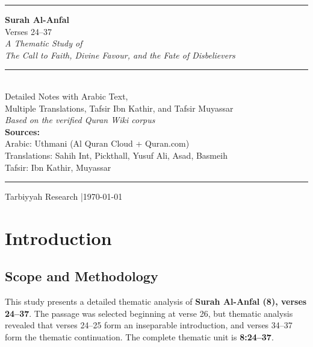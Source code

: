 \documentclass[11pt,a4paper,openany]{book}
\begin{document}
\begin{titlepage}
\thispagestyle{empty}
\begin{center}
\vspace*{3cm}
{\color{accent}\rule{\textwidth}{2pt}}
\vspace{1.5cm}
{\Huge\bfseries\color{primary} Surah Al-Anfal}\\[0.5cm]
{\LARGE\color{primarydk} Verses 24--37}\\[1cm]
{\Large\color{accent2}\itshape A Thematic Study of\\[0.3cm] The Call to Faith, Divine Favour, and the Fate of Disbelievers}\\[1.5cm]
{\color{accent}\rule{0.6\textwidth}{1pt}}\\[0.8cm]
{\large\color{textmuted} Detailed Notes with Arabic Text,\\ Multiple Translations, Tafsir Ibn Kathir, and Tafsir Muyassar}\\[0.5cm]
{\normalsize\color{textmuted}\itshape Based on the verified Quran Wiki corpus}\\[2cm]
{\small\color{textmuted}\textbf{Sources:}\\ Arabic: Uthmani (Al Quran Cloud + Quran.com)\\ Translations: Sahih Int, Pickthall, Yusuf Ali, Asad, Basmeih\\ Tafsir: Ibn Kathir, Muyassar}
\vfill
{\color{accent}\rule{\textwidth}{2pt}}
\vspace{0.5cm}
{\small\color{textmuted} Tarbiyyah Research \quad|\quad \today}
\end{center}
\end{titlepage}

\tableofcontents
\newpage

\chapter{Introduction}

\section{Scope and Methodology}
This study presents a detailed thematic analysis of \textbf{Surah Al-Anfal (8), verses 24--37}. The passage was selected beginning at verse 26, but thematic analysis revealed that verses 24--25 form an inseparable introduction, and verses 34--37 form the thematic continuation. The complete thematic unit is \textbf{8:24--37}.
\end{document}
